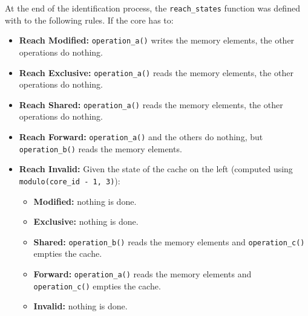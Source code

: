 At the end of the identification process, the \lstinline!reach_states! function
was defined with to the following rules. If the core has to:
\begin{itemize}
\item \textbf{Reach Modified:}
   \lstinline!operation_a()! writes the memory elements, the other operations do
   nothing.
\item \textbf{Reach Exclusive:}
   \lstinline!operation_a()! reads the memory elements, the other operations do
   nothing.
\item \textbf{Reach Shared:}
   \lstinline!operation_a()! reads the memory elements, the other operations do
   nothing.
\item \textbf{Reach Forward:}
   \lstinline!operation_a()! and the others do nothing, but
   \lstinline!operation_b()! reads the memory elements.
\item \textbf{Reach Invalid:}
   Given the state of the cache on the left (computed using
   \lstinline!modulo(core_id - 1, 3)!):
   \begin{itemize}
      \item \textbf{Modified:} nothing is done.
      \item \textbf{Exclusive:} nothing is done.
      \item \textbf{Shared:} \lstinline!operation_b()! reads the memory elements
         and \lstinline!operation_c()! empties the cache.
      \item \textbf{Forward:} \lstinline!operation_a()! reads the memory
         elements and \lstinline!operation_c()! empties the cache.
      \item \textbf{Invalid:} nothing is done.
   \end{itemize}
\end{itemize}

